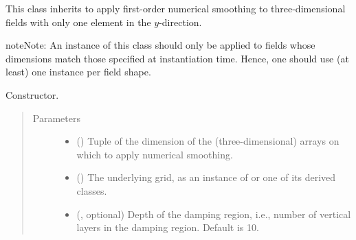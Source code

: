 \documentclass[letterpaper,10pt,english]{sphinxmanual}
\begin{document}
\begin{fulllineitems}
\label{\detokenize{api:dycore.horizontal_smoothing.HorizontalSmoothingFirstOrderXZ}}
This class inherits {\hyperref[\detokenize{api:dycore.horizontal_smoothing.HorizontalSmoothing}]{}} to apply first-order numerical smoothing to
three-dimensional fields with only one element in the \(y\)-direction.

\begin{sphinxadmonition}{note}{Note:}
An instance of this class should only be applied to fields whose dimensions match those specified at instantiation time.
Hence, one should use (at least) one instance per field shape.
\end{sphinxadmonition}

\begin{fulllineitems}
\label{\detokenize{api:dycore.horizontal_smoothing.HorizontalSmoothingFirstOrderXZ.__init__}}
Constructor.
\begin{quote}\begin{description}
\item[{Parameters}] \leavevmode\begin{itemize}
\item {} 
 () \textendash{} Tuple of the dimension of the (three-dimensional) arrays on which to apply numerical smoothing.

\item {} 
 () \textendash{} The underlying grid, as an instance of {\hyperref[\detokenize{api:grids.grid_xyz.GridXYZ}]{}} or one of its derived classes.

\item {} 
 (, optional) \textendash{} Depth of the damping region, i.e., number of vertical layers in the damping region. Default is 10.


\end{itemize}
\end{description}
\end{quote}
\end{fulllineitems}
\end{fulllineitems}
\end{document}
